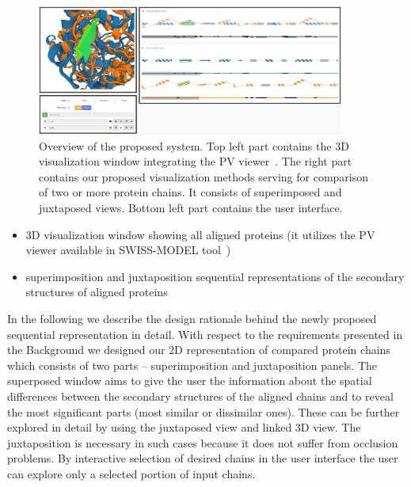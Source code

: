 \documentclass[twocolumn]{bmcart}%
\begin{document}
\begin{figure}[t]
  \centering
  \includegraphics[width=0.9\textwidth]{pics/flattening_design2.png}
  \caption{Overview of the proposed system. Top left part contains the 3D visualization window integrating the PV viewer~\cite{biasini2014}. The right part contains our proposed visualization methods serving for comparison of two or more protein chains. It consists of superimposed and juxtaposed views. Bottom left part contains the user interface.}
  \label{fig:design}
\end{figure}

\begin{itemize}
\item 3D visualization window showing all aligned proteins (it utilizes the PV viewer available in SWISS-MODEL tool~\cite{biasini2014})
\item superimposition and juxtaposition sequential representations of the secondary structures of aligned proteins
\end{itemize}

In the following we describe the design rationale behind the newly proposed sequential representation in detail.
With respect to the requirements presented in the Background we designed our 2D representation of compared protein chains which consists of two parts -- superimposition and juxtaposition panels.
The superposed window aims to give the user the information about the spatial differences between the secondary structures of the aligned chains and to reveal the most significant parts (most similar or dissimilar ones).
These can be further explored in detail by using the juxtaposed view and linked 3D view.
The juxtaposition is necessary in such cases because it does not suffer from occlusion problems.
By interactive selection of desired chains in the user interface the user can explore only a selected portion of input chains.
\end{document}
